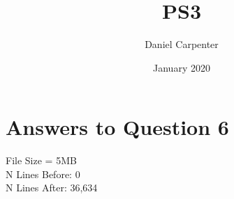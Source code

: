 \documentclass{article}
\title{PS3}
\author{Daniel Carpenter}
\date{January 2020}
\begin{document}
\maketitle

\section{Answers to Question 6}
 File Size = 5MB
 \\
 N Lines Before: 0
 \\
 N Lines After: 36,634
 
\end{document}
